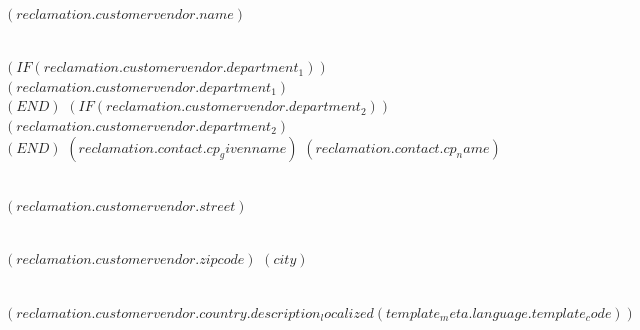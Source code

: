 \documentclass[paper=a4,fontsize=10pt]{scrartcl}
\begin{document}
\begin{letter}{
  $( reclamation.customervendor.name )$\strut\\
  $( IF (reclamation.customervendor.department_1) )$$( reclamation.customervendor.department_1 )$\\$( END )$%
  $( IF (reclamation.customervendor.department_2) )$$( reclamation.customervendor.department_2 )$\\$( END )$%
  $( reclamation.contact.cp_givenname )$ $( reclamation.contact.cp_name )$\strut\\
  $( reclamation.customervendor.street )$\strut\\
  $( reclamation.customervendor.zipcode )$ $( city )$\strut\\
  $( reclamation.customervendor.country.description_localized(template_meta.language.template_code) )$ \strut
    }

    \opening{
    }
    \thispagestyle{kivitendo.letter.first}

    \vkreklamationsformel


\end{letter}
\end{document}
